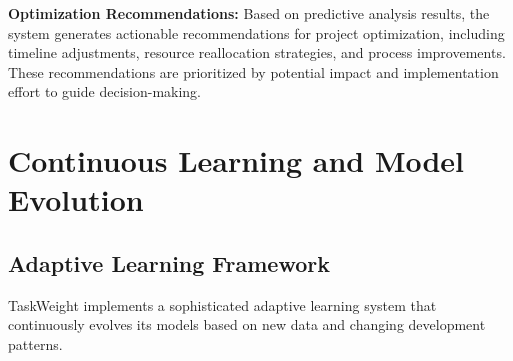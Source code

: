 \documentclass[12pt,a4paper]{article}
\begin{document}
\textbf{Optimization Recommendations:} Based on predictive analysis results, the system generates actionable recommendations for project optimization, including timeline adjustments, resource reallocation strategies, and process improvements. These recommendations are prioritized by potential impact and implementation effort to guide decision-making.

\section{Continuous Learning and Model Evolution}

\subsection{Adaptive Learning Framework}

TaskWeight implements a sophisticated adaptive learning system that continuously evolves its models based on new data and changing development patterns.
\end{document}
